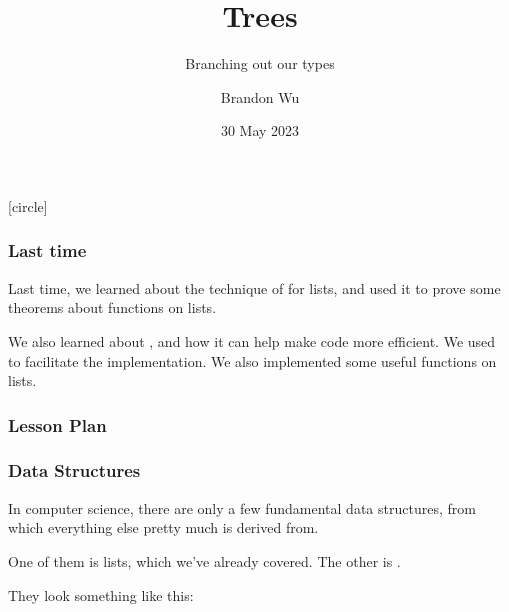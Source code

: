 \documentclass[aspectratio=169, handout]{beamer}
\title{Trees} %
\subtitle{Branching out our types} %
\date{30 May 2023} %
\author{Brandon Wu} %
\newif\ifcolorlambda
\begin{document}
\ifweb
    \renewcommand{\pause}{}
\fi

[circle]

{
\begin{frame}[plain]
    \colorlambdatrue
    \titlepage
\end{frame}
}

\begin{frame}[fragile]
  \frametitle{Last time}

  Last time, we learned about the technique of  for lists, and
  used it to prove some theorems about functions on lists.

  \vspace{\fill}

  We also learned about , and how it can help make code more efficient. We
  used  to facilitate the implementation. We also implemented some useful
  functions on lists.
\end{frame}

\begin{frame}[fragile]
  \frametitle{Lesson Plan}

  \tableofcontents
\end{frame}


\begin{frame}[fragile]
  \frametitle{Data Structures}

  In computer science, there are only a few fundamental data structures, from which everything
  else pretty much is derived from.

  \pause
  \vspace{\fill}

  One of them is lists, which we've already covered. The other is .

  \pause
  \vspace{\fill}


  \pause
  \vspace{\fill}

  They look something like this:

  \vspace{\fill}

  \begin{center}
  \end{center}
\end{frame}
\end{document}
